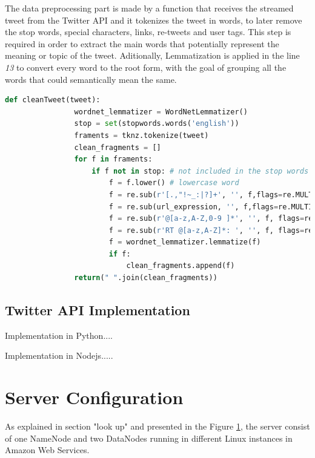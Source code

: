 \documentclass{article}
\begin{document}
        The data preprocessing part is made by a function that receives the streamed tweet from the Twitter API and it tokenizes the tweet in words, to later remove the stop words, special characters, links, re-tweets and user tags. This step is required in order to extract the main words that potentially represent the meaning or topic of the tweet. Aditionally, Lemmatization is applied in the line \textit{13} to convert every word to the root 
        form, with the goal of grouping all the words that could semantically mean the same.
        \begin{lstlisting}[language=Python, caption= Python Cleaning Function, label={lst:dataCleaning}]
            def cleanTweet(tweet):    
                wordnet_lemmatizer = WordNetLemmatizer()
                stop = set(stopwords.words('english'))
                framents = tknz.tokenize(tweet)
                clean_fragments = []
                for f in framents:
                    if f not in stop: # not included in the stop words
                        f = f.lower() # lowercase word
                        f = re.sub(r'[.,"!~_:|?]+', '', f,flags=re.MULTILINE)
                        f = re.sub(url_expression, '', f,flags=re.MULTILINE) 
                        f = re.sub(r'@[a-z,A-Z,0-9 ]*', '', f, flags=re.MULTILINE) 
                        f = re.sub(r'RT @[a-z,A-Z]*: ', '', f, flags=re.MULTILINE) 
                        f = wordnet_lemmatizer.lemmatize(f)
                        if f:
                            clean_fragments.append(f)
                return(" ".join(clean_fragments))
        \end{lstlisting}

        \subsection{Twitter API Implementation}

        Implementation in Python....
        

        Implementation in Nodejs.....
        
        
        \section{Server Configuration}

        As  explained in section "look up" and presented in the Figure \ref{}, the server consist of one NameNode and two DataNodes running in different Linux instances in Amazon Web Services.
\end{document}

